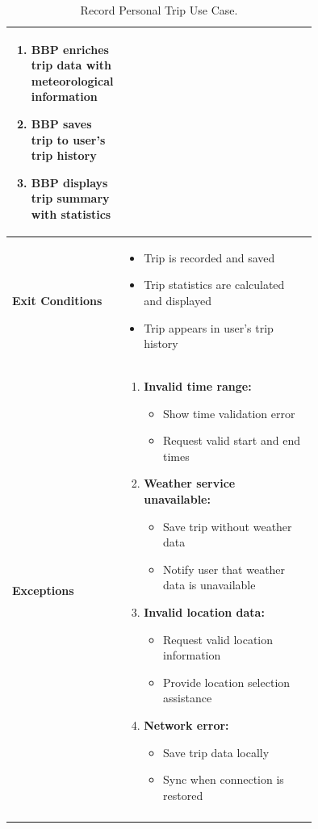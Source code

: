 \begin{center}
\begin{longtable}{|l|p{0.75\linewidth}|}
\begin{enumerate}
            \item BBP enriches trip data with meteorological information
            \item BBP saves trip to user's trip history
            \item BBP displays trip summary with statistics
        \end{enumerate} \\
        \hline
        \textbf{Exit Conditions}   & 
        \begin{itemize}
            \item Trip is recorded and saved
            \item Trip statistics are calculated and displayed
            \item Trip appears in user's trip history
        \end{itemize} \\
        \hline
        \textbf{Exceptions}       & 
        \begin{enumerate}
            \item \textbf{Invalid time range:}
            \begin{itemize}
                \item Show time validation error
                \item Request valid start and end times
            \end{itemize}
            \item \textbf{Weather service unavailable:}
            \begin{itemize}
                \item Save trip without weather data
                \item Notify user that weather data is unavailable
            \end{itemize}
            \item \textbf{Invalid location data:}
            \begin{itemize}
                \item Request valid location information
                \item Provide location selection assistance
            \end{itemize}
            \item \textbf{Network error:}
            \begin{itemize}
                \item Save trip data locally
                \item Sync when connection is restored
            \end{itemize}
        \end{enumerate} \\
        \hline
        \caption{Record Personal Trip Use Case.}
        \label{tab:record_personal_trip_use_case}
    \end{longtable}
\end{center}

